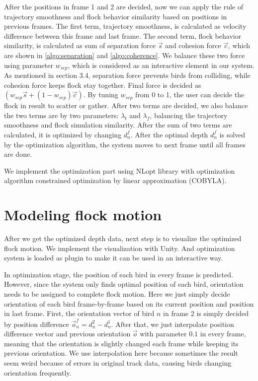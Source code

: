 After the positions in frame 1 and 2 are decided, now we can apply the rule of trajectory smoothness and flock behavior similarity based on positions in previous frames. The first term, trajectory smoothness, is calculated as velocity difference between this frame and last frame. The second term, flock behavior similarity, is calculated as sum of separation force $\vec{s}$ and cohesion force $\vec{c}$, which are shown in \ref{algo:separation} and \ref{algo:coherence}. We balance these two force using parameter $w_{sep}$, which is considered as an interactive element in our system. As mentioned in section 3.4, separation force prevents birds from colliding, while cohesion force keeps flock stay together. Final force is decided as $(w_{sep} \vec{s}+(1-w_{sep})\vec{c})$. By tuning $w_{sep}$ from 0 to 1, the user can decide the flock in result to scatter or gather. After two terms are decided, we also balance the two terms are by two parameters: $\lambda_{t}$ and $\lambda_{f}$, balancing the trajectory smoothness and flock simulation similarity. After the sum of two terms are calculated, it is optimized by changing $d_n^f$. After the optimal depth $d_n^f$ is solved by the optimization algorithm, the system moves to next frame until all frames are done.


We implement the optimization part using NLopt library \cite{NLopt} with optimization algorithm constrained optimization by linear approximation (COBYLA)\cite{COBYLA}.



\section{Modeling flock motion}


After we get the optimized depth data, next step is to visualize the optimized flock motion. We implement the visualization with Unity\cite{Unity}. And optimization system is loaded as plugin to make it can be used in an interactive way.


In optimization stage, the position of each bird in every frame is predicted. However, since the system only finds optimal position of each bird, orientation needs to be assigned to complete flock motion. Here we just simply decide orientation of each bird frame-by-frame based on its current position and position in last frame. First, the orientation vector of bird $n$ in frame 2 is simply decided by position difference $\vec{o}_n^f=d_n^2 - d_n^1$. After that, we just interpolate position difference vector and previous orientation $\vec{o}$ with parameter $0.1$ in every frame, meaning that the orientation is slightly changed each frame while keeping its previous orientation. We use interpolation here because sometimes the result seem weird because of errors in original track data, causing birds changing orientation frequently.



